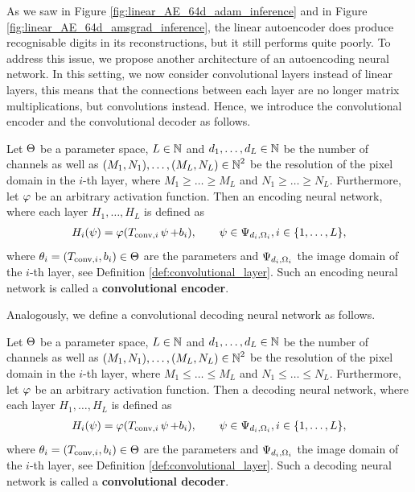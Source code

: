 As we saw in Figure \ref{fig:linear_AE_64d_adam_inference} and in Figure \ref{fig:linear_AE_64d_amsgrad_inference}, the linear autoencoder does produce recognisable digits in its reconstructions, but it still performs quite poorly. To address this issue, we propose another architecture of an autoencoding neural network. In this setting, we now consider convolutional layers instead of linear layers, this means that the connections between each layer are no longer matrix multiplications, but convolutions instead. Hence, we introduce the convolutional encoder and the convolutional decoder as follows.


\begin{definition}\label{def_convolutional_encoder}
Let $\operatorname{\Theta}$ be a parameter space, $L\in \operatorname{\mathbb{N}}$ and $d_1,\ldots, d_L\in\operatorname{\mathbb{N}}$ be the number of channels as well as $(M_1,N_1),\ldots,(M_L,N_L) \in \operatorname{\mathbb{N}}^2$ be the resolution of the pixel domain in the $i$-th layer, where $M_1\geq \ldots \geq M_L$ and $N_1\geq \ldots \geq N_L$. Furthermore, let $\operatorname{\varphi}$ be an arbitrary activation function. Then an encoding neural network, where each layer $H_1,\ldots, H_L$ is defined as
\begin{align*}
H_i(\operatorname{\psi}) = \operatorname{\varphi}(T_{\text{conv}, i}\operatorname{\psi} + b_i), \qquad \operatorname{\psi} \in \Psi_{d_i,\Omega_i}, i \in \{1,\ldots, L\},
\end{align*}
where $\theta_i = (T_{\text{conv}, i}, b_i)\in\operatorname{\Theta}$ are the parameters and $\Psi_{d_i,\Omega_i}$ the image domain of the $i$-th layer, see Definition \ref{def:convolutional_layer}. Such an encoding neural network is called a \textbf{convolutional encoder}.
\end{definition}

Analogously, we define a convolutional decoding neural network as follows.

\begin{definition}\label{def_convolutional_decoder}
Let $\operatorname{\Theta}$ be a parameter space, $L\in \operatorname{\mathbb{N}}$ and $d_1,\ldots, d_L\in\operatorname{\mathbb{N}}$ be the number of channels as well as $(M_1,N_1),\ldots,(M_L,N_L) \in \operatorname{\mathbb{N}}^2$ be the resolution of the pixel domain in the $i$-th layer, where $M_1\leq \ldots \leq M_L$ and $N_1\leq \ldots \leq N_L$. Furthermore, let $\operatorname{\varphi}$ be an arbitrary activation function. Then a decoding neural network, where each layer $H_1,\ldots, H_L$ is defined as
\begin{align*}
H_i(\operatorname{\psi}) = \operatorname{\varphi}(T_{\text{conv}, i}\operatorname{\psi} + b_i), \qquad \operatorname{\psi} \in \Psi_{d_i,\Omega_i}, i \in \{1,\ldots, L\},
\end{align*}
where $\theta_i = (T_{\text{conv}, i}, b_i)\in\operatorname{\Theta}$ are the parameters and $\Psi_{d_i,\Omega_i}$ the image domain of the $i$-th layer, see Definition \ref{def:convolutional_layer}. Such a decoding neural network is called a \textbf{convolutional decoder}.
\end{definition}

